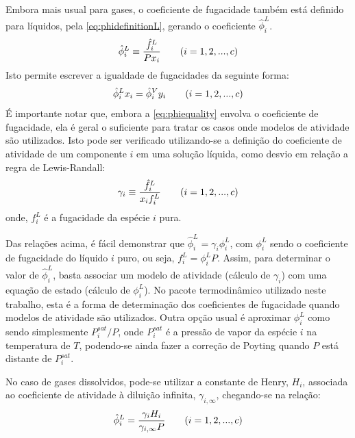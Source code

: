 \begin{enumerate}
Embora mais usual para gases, o coeficiente de fugacidade também
está definido para líquidos, pela \autoref{eq:phidefinitionL}, gerando o coeficiente $\hat{\phi}^L_i$.
\begin{equation}
\hat{\phi}^L_i \equiv \dfrac{\hat{f}^L_i}{Px_i} \qquad (i = 1,2,...,c) \\
\label{eq:phidefinitionL}
\end{equation}
Isto permite escrever a igualdade de fugacidades da seguinte forma:
\begin{equation}
\hat{\phi}^L_i x_i = \hat{\phi}^V_i y_i \qquad (i = 1,2,...,c) \\
\label{eq:phiequality}
\end{equation}
É importante notar que, embora a \autoref{eq:phiequality} envolva o
coeficiente de fugacidade, ela é geral o suficiente para tratar os casos onde
modelos de atividade são utilizados.
Isto pode ser verificado utilizando-se a definição do coeficiente de atividade
de um componente $i$ em uma solução líquida, como desvio em relação a regra de Lewis-Randall:
\begin{equation}
\gamma_i \equiv \dfrac{\hat{f}^L_i}{x_if^L_i} \qquad (i = 1,2,...,c) \\
\label{eq:gammadefinition}
\end{equation}
onde, $f^L_i$ é a fugacidade da espécie $i$ pura.

Das relações acima, é fácil demonstrar que $\hat{\phi}^L_i = \gamma_i \phi^L_i$,
com $\phi^L_i$ sendo o coeficiente de fugacidade do líquido $i$ puro, ou seja, $f^L_i = \phi^L_i P$. Assim,
para determinar o valor de $\hat{\phi}^L_i$,
basta associar um modelo de atividade (cálculo de $\gamma_i$) com uma equação de
estado (cálculo de $\phi^L_i$).
No pacote termodinâmico utilizado neste trabalho, esta é a forma de determinação
dos coeficientes de fugacidade quando modelos de atividade são utilizados.
Outra opção usual é aproximar $\phi^L_i$ como sendo simplesmente $P^{sat}_i/P$, onde
$P^{sat}_i$ é a pressão de vapor da espécie $i$ na temperatura de $T$, podendo-se ainda
fazer a correção de Poyting quando $P$ está distante de $P^{sat}_i$.

No caso de gases dissolvidos, pode-se utilizar a constante de Henry, $H_i$, associada ao coeficiente de
atividade à diluição infinita, $\gamma_{i,\infty}$, chegando-se na relação:
\begin{equation}
\hat{\phi}^L_i = \dfrac{\gamma_i H_i}{\gamma_{i,\infty} P} \qquad (i = 1,2,...,c) \\
\label{eq:gammadefinitionHenry}
\end{equation}


\end{enumerate}
